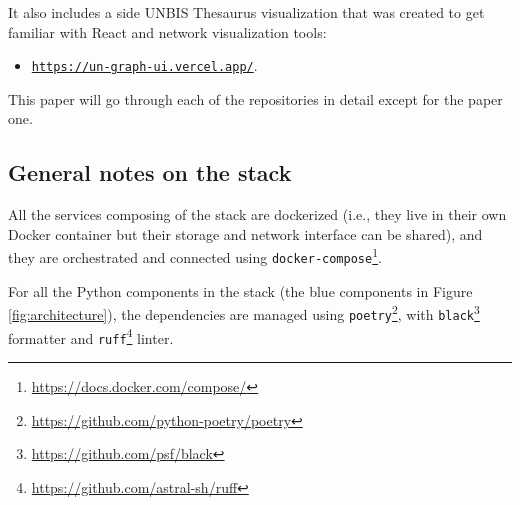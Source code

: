It also includes a side UNBIS Thesaurus visualization that was created to get familiar with React and network visualization tools:
\begin{itemize}
    \item
          \href{https://un-graph-ui.vercel.app/}{\faCloud{} \texttt{https://un-graph-ui.vercel.app/}}.
\end{itemize}


This paper will go through each of the repositories in detail except for the paper one.






















\subsection{General notes on the stack} \label{ssec:general-tech-stack-notes}

All the services composing of the stack are dockerized (i.e., they live in their own Docker container but their storage and network interface can be shared), and they are orchestrated and connected using \texttt{docker-compose}\footnote{\url{https://docs.docker.com/compose/}}.

For all the Python components in the stack (the blue components in Figure \ref{fig:architecture}), the dependencies are managed using \texttt{poetry}\footnote{\url{https://github.com/python-poetry/poetry}}, with \texttt{black}\footnote{\url{https://github.com/psf/black}} formatter and \texttt{ruff}\footnote{\url{https://github.com/astral-sh/ruff}} linter.
